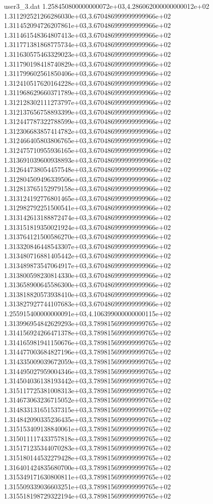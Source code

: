 \begin{filecontents}{user3_3.dat}
1.258450800000000072e+03,4.286062000000000012e+02
1.311292521266286030e+03,3.670486999999999966e+02
1.311452094726207861e+03,3.670486999999999966e+02
1.311461548364807413e+03,3.670486999999999966e+02
1.311771381868775734e+03,3.670486999999999966e+02
1.311630575463329023e+03,3.670486999999999966e+02
1.311790198418740829e+03,3.670486999999999966e+02
1.311799602561850406e+03,3.670486999999999966e+02
1.312410517620164228e+03,3.670486999999999966e+02
1.311968629660371789e+03,3.670486999999999966e+02
1.312128302111273797e+03,3.670486999999999966e+02
1.312137656758893399e+03,3.670486999999999966e+02
1.312447787322788599e+03,3.670486999999999966e+02
1.312306683857414782e+03,3.670486999999999966e+02
1.312466405803806765e+03,3.670486999999999966e+02
1.312475710955936165e+03,3.670486999999999966e+02
1.313691039600938893e+03,3.670486999999999966e+02
1.312644738054457548e+03,3.670486999999999966e+02
1.312804509496339506e+03,3.670486999999999966e+02
1.312813765152979158e+03,3.670486999999999966e+02
1.313124192776801465e+03,3.670486999999999966e+02
1.312982792251500541e+03,3.670486999999999966e+02
1.313142613188872474e+03,3.670486999999999966e+02
1.313151819350021924e+03,3.670486999999999966e+02
1.313764121500586270e+03,3.670486999999999966e+02
1.313320846448543307e+03,3.670486999999999966e+02
1.313480716881405442e+03,3.670486999999999966e+02
1.313489873547064917e+03,3.670486999999999966e+02
1.313800598230814330e+03,3.670486999999999966e+02
1.313658900645586300e+03,3.670486999999999966e+02
1.313818820573938410e+03,3.670486999999999966e+02
1.313827927744107683e+03,3.670486999999999966e+02
1.255915400000000091e+03,4.106399000000000115e+02
1.313996954842629293e+03,3.789815699999999765e+02
1.314156924266471378e+03,3.789815699999999765e+02
1.314165981941150676e+03,3.789815699999999765e+02
1.314477003684827196e+03,3.789815699999999765e+02
1.314335009039672059e+03,3.789815699999999765e+02
1.314495027959004346e+03,3.789815699999999765e+02
1.314504036138193442e+03,3.789815699999999765e+02
1.315117725381008313e+03,3.789815699999999765e+02
1.314673063236715052e+03,3.789815699999999765e+02
1.314833131651537315e+03,3.789815699999999765e+02
1.314842090335236435e+03,3.789815699999999765e+02
1.315153409138840061e+03,3.789815699999999765e+02
1.315011117433757818e+03,3.789815699999999765e+02
1.315171235344070283e+03,3.789815699999999765e+02
1.315180144532279428e+03,3.789815699999999765e+02
1.316401424835680700e+03,3.789815699999999765e+02
1.315349171630800811e+03,3.789815699999999765e+02
1.315509339036603251e+03,3.789815699999999765e+02
1.315518198729322194e+03,3.789815699999999765e+02

\end{filecontents}
